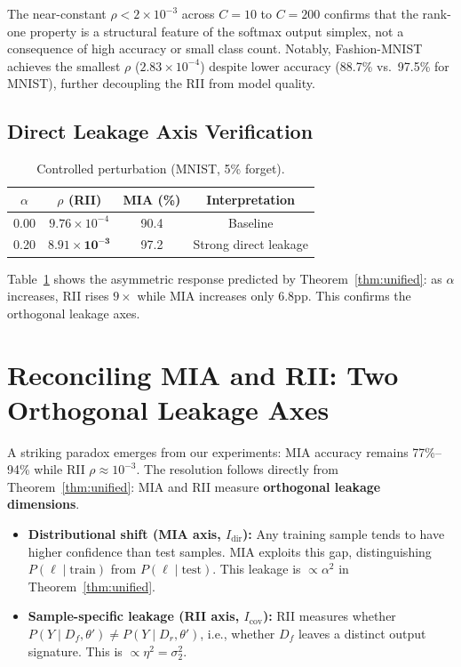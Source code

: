 \documentclass[journal]{IEEEtran}
\theoremstyle{definition}
\begin{document}
The near-constant $\rho < 2\times 10^{-3}$ across $C=10$ to $C=200$ confirms that the rank-one property is a structural feature of the softmax output simplex, not a consequence of high accuracy or small class count. Notably, Fashion-MNIST achieves the smallest $\rho$ ($2.83\times10^{-4}$) despite lower accuracy (88.7\% vs.\ 97.5\% for MNIST), further decoupling the RII from model quality.

\subsection{Direct Leakage Axis Verification}
\label{sec:alpha_experiment}

\begin{table}[t]
\centering
\caption{Controlled perturbation (MNIST, 5\% forget).}\label{tab:alpha}
\setlength{\tabcolsep}{3pt}
\begin{tabular}{c c c c}
\toprule
$\alpha$ & $\rho$ (RII) & MIA (\%) & Interpretation \\
\midrule
0.00 & $9.76{\times}10^{-4}$ & 90.4 & Baseline \\
0.20 & $\mathbf{8.91{\times}10^{-3}}$ & 97.2 & Strong direct leakage \\
\bottomrule
\end{tabular}
\end{table}

Table~\ref{tab:alpha} shows the asymmetric response predicted by Theorem~\ref{thm:unified}: as $\alpha$ increases, RII rises $9\times$ while MIA increases only 6.8pp. This confirms the orthogonal leakage axes.

\section{Reconciling MIA and RII: Two Orthogonal Leakage Axes}
\label{sec:mia}

A striking paradox emerges from our experiments: MIA accuracy remains 77\%--94\% while RII $\rho \approx 10^{-3}$. The resolution follows directly from Theorem~\ref{thm:unified}: MIA and RII measure \textbf{orthogonal leakage dimensions}.

\begin{itemize}
\item \textbf{Distributional shift (MIA axis, $I_{\mathrm{dir}}$):} Any training sample tends to have higher confidence than test samples. MIA exploits this gap, distinguishing $P(\ell \mid \text{train})$ from $P(\ell \mid \text{test})$. This leakage is $\propto \alpha^2$ in Theorem~\ref{thm:unified}.
\item \textbf{Sample-specific leakage (RII axis, $I_{\mathrm{cov}}$):} RII measures whether $P(Y \mid D_f, \theta') \neq P(Y \mid D_r, \theta')$, i.e., whether $D_f$ leaves a distinct output signature. This is $\propto \eta^2 = \sigma_2^2$.
\end{itemize}
\end{document}
